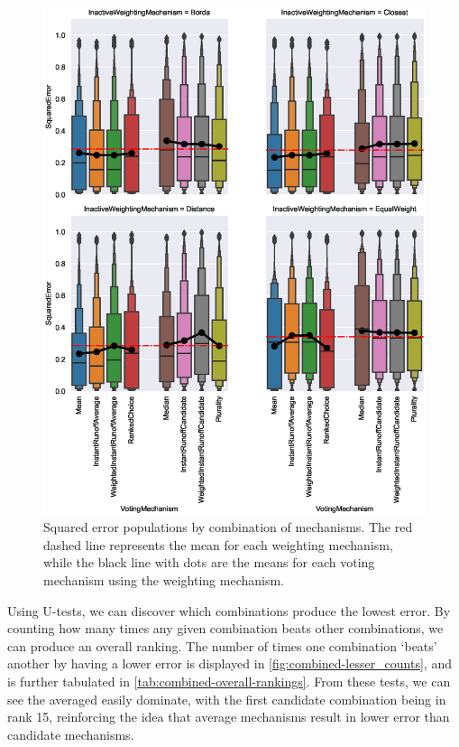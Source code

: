 \begin{figure}[htbp]
    \centering
    \includegraphics[scale=0.75]
    {./content/figures/combinations/combined_comparison}
    \caption{Squared error populations by combination of mechanisms. The red dashed
    line represents the mean for each weighting mechanism, while the black line with
    dots are the means for each voting mechanism using the weighting mechanism.}
    \label{fig:combined-comparison}
\end{figure}

Using U-tests, we can discover which combinations produce the lowest error.
By counting how many times any given combination beats other combinations, we can
produce an overall ranking.
The number of times one combination `beats' another by having a lower error is
displayed in \autoref{fig:combined-lesser_counts}, and is further tabulated in
\autoref{tab:combined-overall-rankings}.
From these tests, we can see the averaged easily dominate, with the first candidate
combination being in rank 15, reinforcing the idea that average mechanisms result in
lower error than candidate mechanisms.

